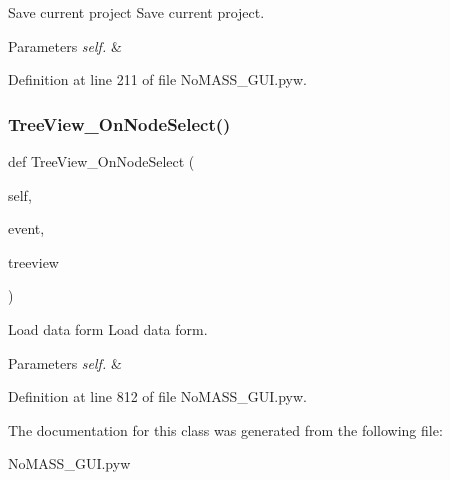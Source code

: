 Save current project Save current project. 


\begin{DoxyParams}{Parameters}
{\em self.} & \\
\hline
\end{DoxyParams}


Definition at line 211 of file No\+M\+A\+S\+S\+\_\+\+G\+U\+I.\+pyw.

\mbox{\label{class_no_m_a_s_s___g_u_i_1_1_app_a7208f3b1f5b7729d83c63f0eb6f97a8a}} 
\subsubsection{\texorpdfstring{Tree\+View\+\_\+\+On\+Node\+Select()}{TreeView\_OnNodeSelect()}}
{\footnotesize\ttfamily def Tree\+View\+\_\+\+On\+Node\+Select (\begin{DoxyParamCaption}\item[{}]{self,  }\item[{}]{event,  }\item[{}]{treeview }\end{DoxyParamCaption})}



Load data form Load data form. 


\begin{DoxyParams}{Parameters}
{\em self.} & \\
\hline
\end{DoxyParams}


Definition at line 812 of file No\+M\+A\+S\+S\+\_\+\+G\+U\+I.\+pyw.



The documentation for this class was generated from the following file\+:\begin{DoxyCompactItemize}
\item 
No\+M\+A\+S\+S\+\_\+\+G\+U\+I.\+pyw\end{DoxyCompactItemize}
